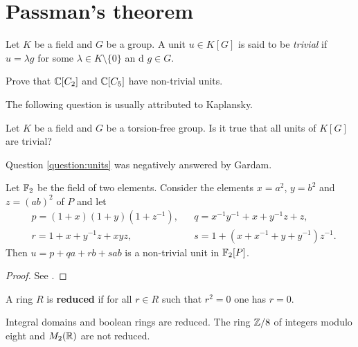 \section{Passman's theorem}
\label{section:Passman}


Let $K$ be a field and $G$ be a group. A unit $u\in K[G]$ is said
to be \emph{trivial} if $u=\lambda g$ for some $\lambda\in K\setminus\{0\}$ an
d
$g\in G$.

\begin{exercise}
\label{xca:non_trivial:C2andC5}
        Prove that $\mathbb{C}[C_2]$ and $\mathbb{C}[C_5]$ have non-trivial units.
\end{exercise}

The following question is usually attributed to Kaplansky.

\begin{question}
        \label{question:units}
        Let $K$ be a field and $G$ be a torsion-free group. Is it true that all
        units of $K[G]$ are
        trivial?
\end{question}

Question \ref{question:units} was negatively answered by Gardam.

\begin{theorem}[Gardam]
\label{thm:Gardam_char2}
    Let $\mathbb{F}_2$ be the field of two elements. Consider the elements
    $x=a^2$, $y=b^2$ and $z=(ab)^2$ of $P$ and let
    \begin{align*}
        &p=(1+x)(1+y)(1+z^{-1}),
        &&q = x^{-1}y^{-1}+x+y^{-1}z+z,\\
        &r = 1+x+y^{-1}z+xyz,
        &&s=1+(x+x^{-1}+y+y^{-1})z^{-1}.
    \end{align*}
    Then $u=p+qa+rb+sab$ is a non-trivial unit in $\mathbb{F}_2[P]$.
\end{theorem}

\begin{proof}
    See \cite{MR4334981}.
\end{proof}

\begin{definition}
A ring $R$ is \textbf{reduced} if for all $r\in R$ such that 
$r^2=0$ one has $r=0$.
\end{definition}

Integral domains and boolean rings are reduced. The ring $\mathbb{Z}/8$ of integers
modulo eight 
and $M_2(\mathbb{R})$ are not reduced. 

